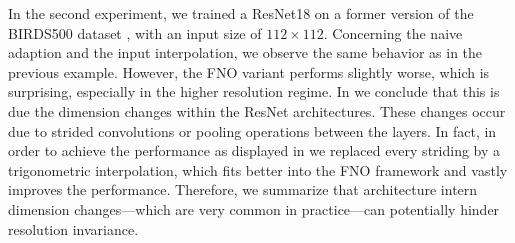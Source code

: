 In the second experiment, we trained a ResNet18 \cite{he2016deep} on a former version of the BIRDS500 dataset \cite{pio450}, with an input size of $112\times 112$. Concerning the naive adaption and the input interpolation, we observe the same behavior as in the previous example. However, the FNO variant performs slightly worse, which is surprising, especially in the higher resolution regime. In \cite{kabri2023resolution} we conclude that this is due the dimension changes within the ResNet architectures. These changes occur due to strided convolutions or pooling operations between the layers. In fact, in order to achieve the performance as displayed in \cite[Fig. 4 (b)]{kabri2023resolution} we replaced every striding by a trigonometric interpolation, which fits better into the FNO framework and vastly improves the performance. Therefore, we summarize that architecture intern dimension changes---which are very common in practice---can potentially hinder resolution invariance.
%
%
\clearpage%
%
%
